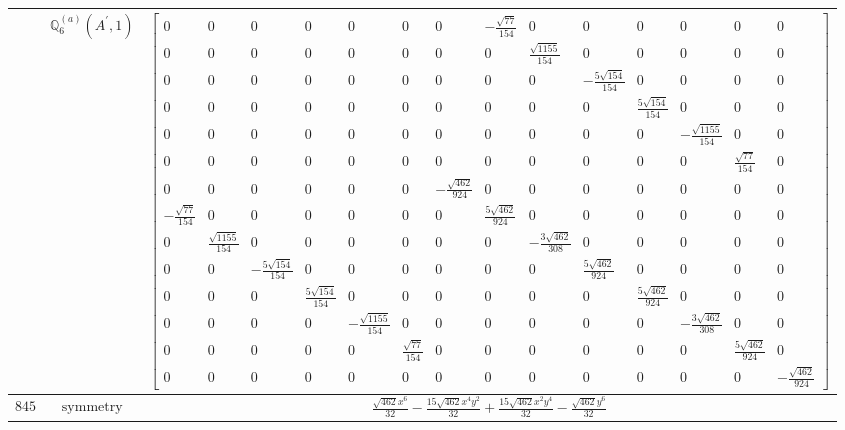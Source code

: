 \documentclass[fleqn,8pt,landscape]{jsarticle}
\begin{document}
\begin{longtable}{ccc}
$  $ & $ \mathbb{Q}_{6}^{(a)}(A^{\prime},1) $ & $ \begin{bmatrix} 0 & 0 & 0 & 0 & 0 & 0 & 0 & - \frac{\sqrt{77}}{154} & 0 & 0 & 0 & 0 & 0 & 0 \\ 0 & 0 & 0 & 0 & 0 & 0 & 0 & 0 & \frac{\sqrt{1155}}{154} & 0 & 0 & 0 & 0 & 0 \\ 0 & 0 & 0 & 0 & 0 & 0 & 0 & 0 & 0 & - \frac{5 \sqrt{154}}{154} & 0 & 0 & 0 & 0 \\ 0 & 0 & 0 & 0 & 0 & 0 & 0 & 0 & 0 & 0 & \frac{5 \sqrt{154}}{154} & 0 & 0 & 0 \\ 0 & 0 & 0 & 0 & 0 & 0 & 0 & 0 & 0 & 0 & 0 & - \frac{\sqrt{1155}}{154} & 0 & 0 \\ 0 & 0 & 0 & 0 & 0 & 0 & 0 & 0 & 0 & 0 & 0 & 0 & \frac{\sqrt{77}}{154} & 0 \\ 0 & 0 & 0 & 0 & 0 & 0 & - \frac{\sqrt{462}}{924} & 0 & 0 & 0 & 0 & 0 & 0 & 0 \\ - \frac{\sqrt{77}}{154} & 0 & 0 & 0 & 0 & 0 & 0 & \frac{5 \sqrt{462}}{924} & 0 & 0 & 0 & 0 & 0 & 0 \\ 0 & \frac{\sqrt{1155}}{154} & 0 & 0 & 0 & 0 & 0 & 0 & - \frac{3 \sqrt{462}}{308} & 0 & 0 & 0 & 0 & 0 \\ 0 & 0 & - \frac{5 \sqrt{154}}{154} & 0 & 0 & 0 & 0 & 0 & 0 & \frac{5 \sqrt{462}}{924} & 0 & 0 & 0 & 0 \\ 0 & 0 & 0 & \frac{5 \sqrt{154}}{154} & 0 & 0 & 0 & 0 & 0 & 0 & \frac{5 \sqrt{462}}{924} & 0 & 0 & 0 \\ 0 & 0 & 0 & 0 & - \frac{\sqrt{1155}}{154} & 0 & 0 & 0 & 0 & 0 & 0 & - \frac{3 \sqrt{462}}{308} & 0 & 0 \\ 0 & 0 & 0 & 0 & 0 & \frac{\sqrt{77}}{154} & 0 & 0 & 0 & 0 & 0 & 0 & \frac{5 \sqrt{462}}{924} & 0 \\ 0 & 0 & 0 & 0 & 0 & 0 & 0 & 0 & 0 & 0 & 0 & 0 & 0 & - \frac{\sqrt{462}}{924} \end{bmatrix} $ \\ \hline
$ 845 $ & $ \text{symmetry} $ & $ \frac{\sqrt{462} x^{6}}{32} - \frac{15 \sqrt{462} x^{4} y^{2}}{32} + \frac{15 \sqrt{462} x^{2} y^{4}}{32} - \frac{\sqrt{462} y^{6}}{32} $ \\

\end{longtable}
\end{document}
